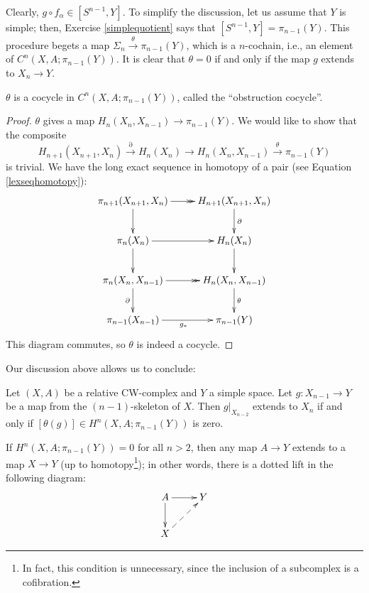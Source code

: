 Clearly, $g\circ f_\alpha\in [S^{n-1},Y]$.
To simplify the discussion, let us assume that $Y$ is simple;
then, Exercise \ref{simplequotient} says that $[S^{n-1},Y] = \pi_{n-1}(Y)$.
This procedure begets a map $\Sigma_n\xrightarrow{\theta}\pi_{n-1}(Y)$, which is a $n$-cochain, i.e., an element of
$C^n(X,A;\pi_{n-1}(Y))$.
It is clear that $\theta = 0$ if and only if the map $g$ extends to $X_n\to Y$.
\begin{prop}
    $\theta$ is a cocycle in $C^n(X,A;\pi_{n-1}(Y))$, called the ``obstruction cocycle''.
\end{prop}
\begin{proof}
    $\theta$ gives a map $H_n(X_n,X_{n-1})\to \pi_{n-1}(Y)$.
    We would like to show that the composite
    $$H_{n+1}(X_{n+1},X_n)\xrightarrow{\partial}H_n(X_n)\to H_n(X_n,X_{n-1})\xrightarrow{\theta}\pi_{n-1}(Y)$$
    is trivial.
    We have the long exact sequence in homotopy of a pair (see Equation \eqref{lexseqhomotopy}):
    \begin{equation*}
	\xymatrix{
	    \pi_{n+1}(X_{n+1},X_n)\ar[d]\ar@{->>}[r] & H_{n+1}(X_{n+1},X_n)\ar[d]^\partial\\
	    \pi_n(X_n)\ar[r]\ar[d] & H_n(X_n)\ar[d]\\
	    \pi_n(X_n,X_{n-1})\ar@{->>}[r] \ar[d]_\partial & H_n(X_n,X_{n-1})\ar[d]^\theta\\
	    \pi_{n-1}(X_{n-1})\ar[r]_{g_\ast} & \pi_{n-1}(Y)
	    }
    \end{equation*}
    This diagram commutes, so $\theta$ is indeed a cocycle.
\end{proof}
Our discussion above allows us to conclude:
\begin{theorem}
    Let $(X,A)$ be a relative CW-complex and $Y$ a simple space.
    Let $g:X_{n-1}\to Y$ be a map from the $(n-1)$-skeleton of $X$.
    Then $g|_{X_{n-2}}$ extends to $X_n$ if and only if $[\theta(g)]\in H^n(X,A;\pi_{n-1}(Y))$ is zero.
\end{theorem}
\begin{corollary}
    If $H^n(X,A;\pi_{n-1}(Y)) = 0$ for all $n>2$, then any map $A\to Y$ extends to a map $X\to Y$ (up to homotopy\footnote{In fact, this condition is unnecessary, since the inclusion
    of a subcomplex is a cofibration.});
    in other words, there is a dotted lift in the following diagram:
    \begin{equation*}
	\xymatrix{
	A\ar[r]\ar[d] & Y\\
	X\ar@{-->}[ur] & 
	}
    \end{equation*}
\end{corollary}
